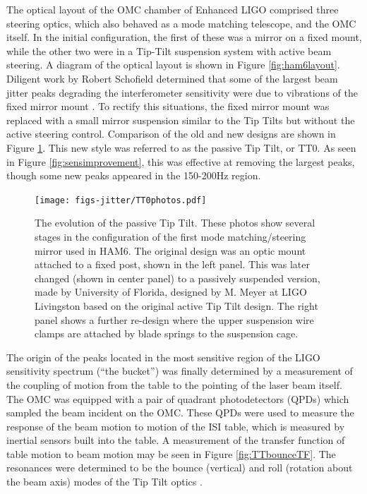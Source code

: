 The optical layout of the OMC chamber of Enhanced LIGO comprised three steering optics, which also behaved as a mode matching telescope, and the OMC itself. %
In the initial configuration, the first of these was a mirror on a fixed mount, while the other two were in a Tip-Tilt suspension system with active beam steering. %
A diagram of the optical layout is shown in Figure \ref{fig:ham6layout}. %
Diligent work by Robert Schofield determined that some of the largest beam jitter peaks degrading the interferometer sensitivity were due to vibrations of the fixed mirror mount \cite{fixedmountpeaks}. %
To rectify this situations, the fixed mirror mount was replaced with a small mirror suspension similar to the Tip Tilts but without the active steering control. %
Comparison of the old and new designs are shown in Figure \ref{fig:TT0photos}. %
This new style was referred to as the passive Tip Tilt, or TT0. %
As seen in Figure \ref{fig:sensimprovement}, this was effective at removing the largest peaks, though some new peaks appeared in the 150-200Hz region.

\begin{figure}
  \begin{center}
  \leavevmode
  \texttt{[image: figs-jitter/TT0photos.pdf]}
  \end{center}
  \caption[The evolution of the passive Tip Tilt.]{The evolution of the passive Tip Tilt. These photos show several stages in the configuration of the first mode matching/steering mirror used in HAM6. The original design was an optic mount attached to a fixed post, shown in the left panel. This was later changed (shown in center panel) to a passively suspended version, made by University of Florida, designed by M. Meyer at LIGO Livingston based on the original active Tip Tilt design. The right panel shows a further re-design where the upper suspension wire clamps are attached by blade springs to the suspension cage.}
  \label{fig:TT0photos}
\end{figure}

The origin of the peaks located in the most sensitive region of the LIGO sensitivity spectrum (``the bucket'') was finally determined by a measurement of the coupling of motion from the table to the pointing of the laser beam itself. %
The OMC was equipped with a pair of quadrant photodetectors (QPDs) which sampled the beam incident on the OMC. %
These QPDs were used to measure the response of the beam motion to motion of the ISI table, which is measured by inertial sensors built into the table. %
A measurement of the transfer function of table motion to beam motion may be seen in Figure \ref{fig:TTbounceTF}. %
The resonances were determined to be the bounce (vertical) and roll (rotation about the beam axis) modes of the Tip Tilt optics \cite{tt1bounce}.

